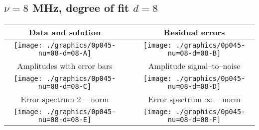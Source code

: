 

% 

\clearpage{}
\break{}

\subsection{$\nu = 8$ MHz, degree of fit $d = 8$}

\begin{table}[h]
    \begin{center}
        \begin{tabular}{ccc}
            Data and solution & \quad & Residual errors \\\hline
            \texttt{[image: ./graphics/0p045-nu=08-d=08-A]} &&
            \texttt{[image: ./graphics/0p045-nu=08-d=08-B]} \\[15pt]
            Amplitudes with error bars && Amplitude signal--to--noise \\\hline
            \texttt{[image: ./graphics/0p045-nu=08-d=08-C]} &&
            \texttt{[image: ./graphics/0p045-nu=08-d=08-D]} \\[15pt]
            Error spectrum $2-$norm && Error spectrum $\infty-$norm \\\hline
            \texttt{[image: ./graphics/0p045-nu=08-d=08-E]} &&
            \texttt{[image: ./graphics/0p045-nu=08-d=08-F]} \\[15pt]
        \end{tabular}
    \end{center}
\label{fig:elev=45, nu=8}
\end{table}



\endinput

